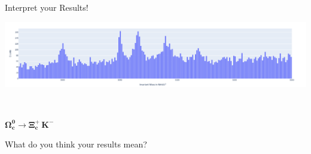 \begin{frame}{Interpret your Results!}

\includegraphics[width=\textwidth]{Figures Discussion/Result_OmegaC.png}

\\ 
\begin{center}
  \Large  $\mathbf{ \Omega_c^0 \rightarrow \Xi_c^+\,K^-}$
\end{center}



   \begin{center} What do you think your results mean? \end{center}

\end{frame}
